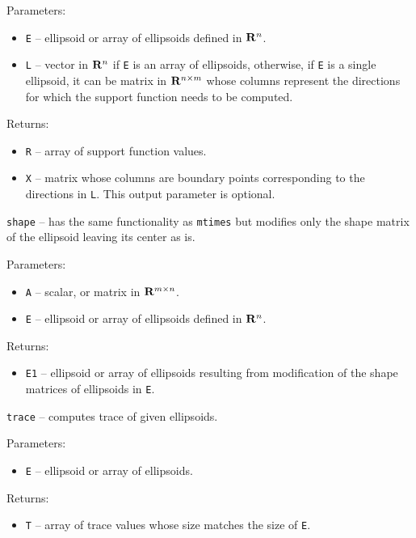 Parameters:
\begin{itemize}
\item {\tt E} -- ellipsoid or array of ellipsoids defined in ${\bf R}^n$.
\item {\tt L} -- vector in ${\bf R}^n$ if {\tt E} is an array of ellipsoids,
otherwise, if {\tt E} is a single ellipsoid, it can be matrix in
${\bf R}^{n\times m}$ whose columns represent the directions for which
the support function needs to be computed.
\end{itemize}

Returns:
\begin{itemize}
\item {\tt R} -- array of support function values.
\item {\tt X} -- matrix whose columns are boundary points corresponding
to the directions in {\tt L}. This output parameter is optional.
\end{itemize}

\newpage

{\Large {\tt shape}} -- has the same functionality as {\tt mtimes} but
modifies only the shape matrix of the ellipsoid leaving its center as is.

Parameters:
\begin{itemize}
\item {\tt A} -- scalar, or matrix in ${\bf R}^{m\times n}$.
\item {\tt E} -- ellipsoid or array of ellipsoids defined in ${\bf R}^n$.
\end{itemize}

Returns:
\begin{itemize}
\item {\tt E1} -- ellipsoid or array of ellipsoids resulting from modification
of the shape matrices of ellipsoids in {\tt E}.
\end{itemize}



\newpage

{\Large {\tt trace}} -- computes trace of given ellipsoids.

Parameters:
\begin{itemize}
\item {\tt E} -- ellipsoid or array of ellipsoids.
\end{itemize}

Returns:
\begin{itemize}
\item {\tt T} -- array of trace values whose size matches the size of {\tt E}.
\end{itemize}

